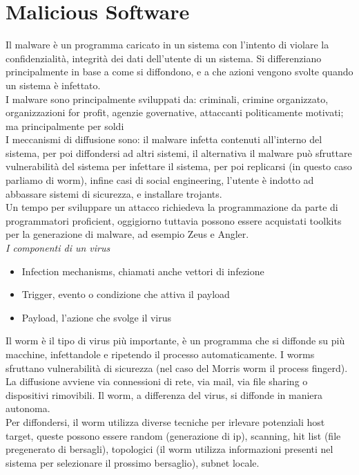 \documentclass[11pt, oneside]{article}   	%
\begin{document}
\section*{Malicious Software}
Il malware è un programma caricato in un sistema con l'intento di violare la confidenzialità, integrità dei dati dell'utente di un sistema. Si differenziano principalmente in base a come si diffondono, e a che azioni vengono svolte quando un sistema è infettato.\\
I malware sono principalmente sviluppati da: criminali, crimine organizzato, organizzazioni for profit, agenzie governative, attaccanti politicamente motivati; ma principalmente per soldi\\
I meccanismi di diffusione sono: il malware infetta contenuti all'interno del sistema, per poi diffondersi ad altri sistemi, il alternativa il malware può sfruttare vulnerabilità del sistema per infettare il sistema, per poi replicarsi (in questo caso parliamo di worm), infine casi di social engineering, l'utente è indotto ad abbassare sistemi di sicurezza, e installare trojants.\\
Un tempo per sviluppare un attacco richiedeva la programmazione da parte di programmatori proficient, oggigiorno tuttavia possono essere acquistati toolkits per la generazione di malware, ad esempio Zeus e Angler.\\
\emph{I componenti di un virus}
\begin{itemize}
\item Infection mechanisms, chiamati anche vettori di infezione
\item Trigger, evento o condizione che attiva il payload
\item Payload, l'azione che svolge il virus
\end{itemize}
Il worm è il tipo di virus più importante, è un programma che si diffonde su più macchine, infettandole e ripetendo il processo automaticamente. I worms sfruttano vulnerabilità di sicurezza (nel caso del Morris worm il process fingerd). La diffusione avviene via connessioni di rete, via mail, via file sharing o dispositivi rimovibili. Il worm, a differenza del virus, si diffonde in maniera autonoma.\\
Per diffondersi, il worm utilizza diverse tecniche per irlevare potenziali host target, queste possono essere random (generazione di ip), scanning, hit list (file pregenerato di bersagli), topologici (il worm utilizza informazioni presenti nel sistema per selezionare il prossimo bersaglio), subnet locale.



\subsection*{}
\end{document}
